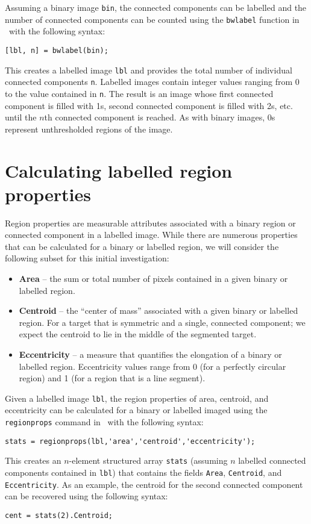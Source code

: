 \documentclass{tufte-handout}
\begin{document}
Assuming a binary image \lstinline{bin}, the connected components can be labelled and the number of connected components can be counted using the \lstinline{bwlabel} function in \Matlab\ with the following syntax:
\begin{lstlisting}[style=usnaMatlab]
[lbl, n] = bwlabel(bin);
\end{lstlisting}
This creates a labelled image \lstinline{lbl} and provides the total number of individual connected components \lstinline{n}. Labelled images contain integer values ranging from 0 to the value contained in \lstinline{n}. The result is an image whose first connected component is filled with 1s, second connected component is filled with 2s, etc. until the $n$th connected component is reached. As with binary images, 0s represent unthresholded regions of the image.

\section{Calculating labelled region properties}
Region properties are measurable attributes associated with a binary region or connected component in a labelled image. While there are numerous properties that can be calculated for a binary or labelled region, we will consider the following subset for this initial investigation: 
\begin{itemize}
\item \textbf{Area} -- the sum or total number of pixels contained in a given binary or labelled region. 
\item \textbf{Centroid} -- the ``center of mass'' associated with a given binary or labelled region. For a target that is symmetric and a single, connected component; we expect the centroid to lie in the middle of the segmented target.
\item \textbf{Eccentricity} -- a measure that quantifies the elongation of a binary or labelled region. Eccentricity values range from 0 (for a perfectly circular region) and 1 (for a region that is a line segment).
\end{itemize}

Given a labelled image \lstinline{lbl}, the region properties of area, centroid, and eccentricity can be calculated for a binary or labelled imaged using the \lstinline{regionprops} command in \Matlab\ with the following syntax:
\begin{lstlisting}[style=usnaMatlab]
stats = regionprops(lbl,'area','centroid','eccentricity');
\end{lstlisting}
This creates an $n$-element structured array \lstinline{stats} (assuming $n$ labelled connected components contained in \lstinline{lbl}) that contains the fields \lstinline{Area}, \lstinline{Centroid}, and \lstinline{Eccentricity}. As an example, the centroid for the second connected component can be recovered using the following syntax:
\begin{lstlisting}[style=usnaMatlab]
cent = stats(2).Centroid;
\end{lstlisting}
\end{document}
